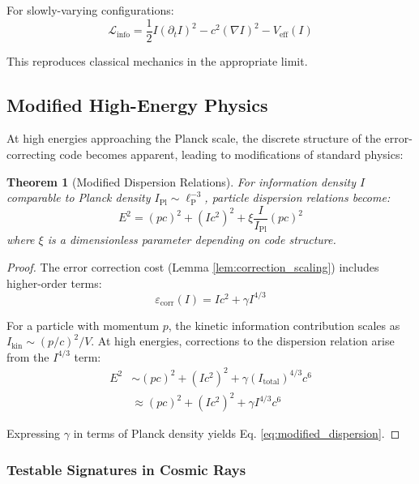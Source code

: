 \documentclass[12pt,a4paper]{article}
\newtheorem{theorem}{Theorem}[section]
\theoremstyle{remark}
\newcommand{\lP}{\ell_{\text{P}}}
\begin{document}
For slowly-varying configurations:
\begin{equation}
\mathcal{L}_{\text{info}} = \frac{1}{2}I(\partial_t I)^2 - c^2(\nabla I)^2 - V_{\text{eff}}(I)
\end{equation}

This reproduces classical mechanics in the appropriate limit.

\subsection{Modified High-Energy Physics}
\label{sec:predictions}

At high energies approaching the Planck scale, the discrete structure of the error-correcting code becomes apparent, leading to modifications of standard physics:

\begin{theorem}[Modified Dispersion Relations]
For information density $I$ comparable to Planck density $I_{\text{Pl}} \sim \lP^{-3}$, particle dispersion relations become:
\begin{equation}
E^2 = (pc)^2 + (Ic^2)^2 + \xi \frac{I}{I_{\text{Pl}}} (pc)^2
\label{eq:modified_dispersion}
\end{equation}
where $\xi$ is a dimensionless parameter depending on code structure.
\end{theorem}

\begin{proof}
The error correction cost (Lemma \ref{lem:correction_scaling}) includes higher-order terms:
\begin{equation}
\varepsilon_{\text{corr}}(I) = I c^2 + \gamma I^{4/3}
\end{equation}

For a particle with momentum $p$, the kinetic information contribution scales as $I_{\text{kin}} \sim (p/c)^2/V$. At high energies, corrections to the dispersion relation arise from the $I^{4/3}$ term:
\begin{align}
E^2 &\sim (pc)^2 + (Ic^2)^2 + \gamma(I_{\text{total}})^{4/3} c^6 \\
&\approx (pc)^2 + (Ic^2)^2 + \gamma I^{4/3} c^6
\end{align}

Expressing $\gamma$ in terms of Planck density yields Eq. \ref{eq:modified_dispersion}.
\end{proof}

\subsubsection{Testable Signatures in Cosmic Rays}
\end{document}
